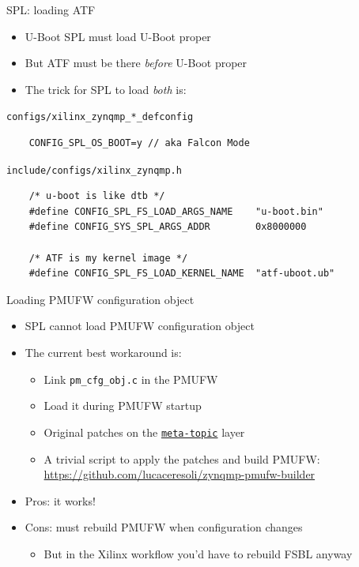 \documentclass[xetex,table]{beamer}
\begin{document}
\begin{frame}[fragile]{SPL: loading ATF}
  \begin{itemize}
  \item U-Boot SPL must load U-Boot proper
  \item But ATF must be there {\em before} U-Boot
    proper
  \item The trick for SPL to load {\em both} is:
  \end{itemize}

  \pause
  {\tt configs/xilinx\_zynqmp\_*\_defconfig}
  \begin{verbatim}
    CONFIG_SPL_OS_BOOT=y // aka Falcon Mode
  \end{verbatim}

  \pause
  {\tt include/configs/xilinx\_zynqmp.h}
  \begin{verbatim}
    /* u-boot is like dtb */
    #define CONFIG_SPL_FS_LOAD_ARGS_NAME    "u-boot.bin"
    #define CONFIG_SYS_SPL_ARGS_ADDR        0x8000000

    /* ATF is my kernel image */
    #define CONFIG_SPL_FS_LOAD_KERNEL_NAME  "atf-uboot.ub"
  \end{verbatim}
\end{frame}

\begin{frame}{Loading PMUFW configuration object}
  \begin{itemize}
  \item SPL cannot load PMUFW configuration object
  \item The current best workaround is:
    \begin{itemize}
    \item Link {\tt pm\_cfg\_obj.c} in the PMUFW
    \item Load it during PMUFW startup
    \item Original patches on the
      \href{https://github.com/topic-embedded-products/meta-topic/tree/0b923bdab78c0a9f6c763dab60ead63bd716bea4/recipes-bsp/pmu-firmware}{\tt meta-topic}
      layer
    \item
      A trivial script to apply the patches and build PMUFW:
      {\footnotesize\url{https://github.com/lucaceresoli/zynqmp-pmufw-builder}}
    \end{itemize}
  \item Pros: it works!
  \item Cons: must rebuild PMUFW when configuration changes
    \begin{itemize}
    \item But in the Xilinx workflow you'd have to rebuild FSBL anyway
    \end{itemize}
  \end{itemize}
\end{frame}
\end{document}
